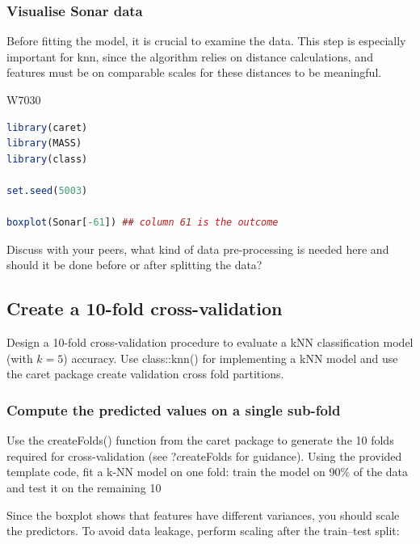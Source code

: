 \subsubsection{Visualise Sonar data}

\indent 

Before fitting the model, it is crucial to examine the data. This step is especially important for knn, since the algorithm relies on distance calculations, and features must be on comparable scales for these distances to be meaningful.


\begin{ocg}{}{W703}{0}
\begin{lstlisting}[language=R]
library(caret)
library(MASS)
library(class)

set.seed(5003)

boxplot(Sonar[-61]) ## column 61 is the outcome
\end{lstlisting}
\end{ocg}

Discuss with your peers, what kind of data pre-processing is needed here and should it be done before or after splitting the data?

\subsection{Create a 10-fold cross-validation}

\indent 

Design a 10-fold cross-validation procedure to evaluate a kNN classification model (with $k=5$) accuracy. Use class::knn() for implementing a kNN model and use the caret package create validation cross fold partitions.

\subsubsection{Compute the predicted values on a single sub-fold}

\indent

Use the createFolds() function from the caret package to generate the 10 folds required for cross-validation (see ?createFolds for guidance). Using the provided template code, fit a k-NN model on one fold: train the model on 90\% of the data and test it on the remaining 10%

Since the boxplot shows that features have different variances, you should scale the predictors. To avoid data leakage, perform scaling after the train–test split:

